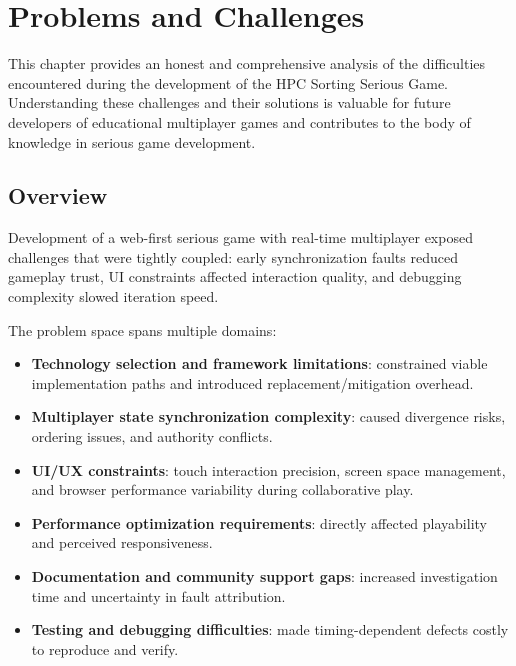 \chapter{Problems and Challenges}
\label{ch:problems}

This chapter provides an honest and comprehensive analysis of the difficulties encountered during the development of the HPC Sorting Serious Game. Understanding these challenges and their solutions is valuable for future developers of educational multiplayer games and contributes to the body of knowledge in serious game development.

\section{Overview}
\label{sec:problems-overview}

Development of a web-first serious game with real-time multiplayer exposed challenges that were tightly coupled: early synchronization faults reduced gameplay trust, UI constraints affected interaction quality, and debugging complexity slowed iteration speed.

The problem space spans multiple domains:

\begin{itemize}
    \item \textbf{Technology selection and framework limitations}: constrained viable implementation paths and introduced replacement/mitigation overhead.
    \item \textbf{Multiplayer state synchronization complexity}: caused divergence risks, ordering issues, and authority conflicts.
    \item \textbf{UI/UX constraints}: touch interaction precision, screen space management, and browser performance variability during collaborative play.
    \item \textbf{Performance optimization requirements}: directly affected playability and perceived responsiveness.
    \item \textbf{Documentation and community support gaps}: increased investigation time and uncertainty in fault attribution.
    \item \textbf{Testing and debugging difficulties}: made timing-dependent defects costly to reproduce and verify.
\end{itemize}

